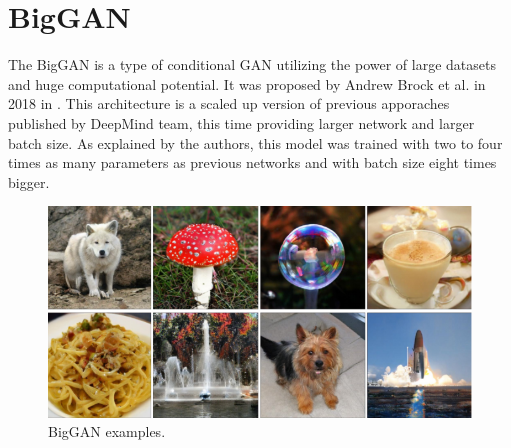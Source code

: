 \documentclass[11pt,a4paper,openany]{book}
\begin{document}





\section{BigGAN}

\noindent The BigGAN is a type of conditional GAN utilizing the power of large datasets and huge computational potential. It was proposed by Andrew Brock et al. in 2018 in \cite{biggan}. This architecture is a scaled up version of previous apporaches published by DeepMind team, this time providing larger network and larger batch size. As explained by the authors, this model was trained with two to four times as many parameters as previous networks and with batch size eight times bigger. 

\begin{figure}[H]
    \centering
    \includegraphics[scale=0.7]{figs/biggan_sample.png}
    \caption{BigGAN examples.}\label{Fig:biggan_sample}
\end{figure}
\end{document}
